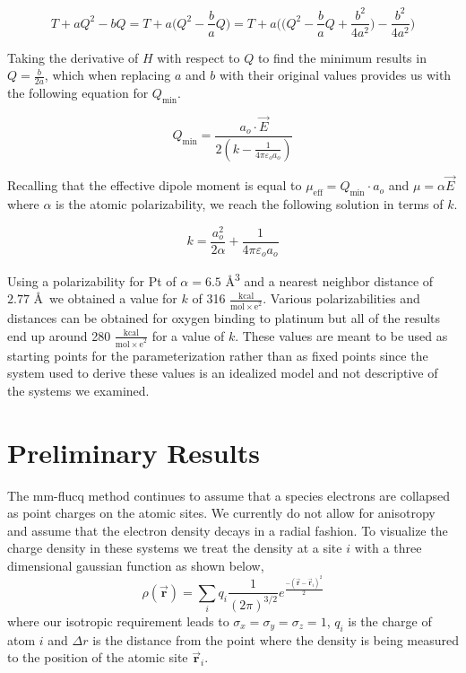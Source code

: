 \begin{equation*}
T + aQ^2 - bQ  = T + a\bigg(Q^2 - \frac{b}{a}Q\bigg) = T + a\bigg(\bigg(Q^2 - \frac{b}{a}Q + \frac{b^2}{4a^2}\bigg) - \frac{b^2}{4a^2}\bigg)
\end{equation*}

Taking the derivative of $H$ with respect to $Q$ to find the minimum results in $Q = \frac{b}{2a}$,
which when replacing $a$ and $b$ with their original values provides us with
the following equation for $Q_{\text{min}}$.

\begin{equation*}
Q_{\text{min}} = \frac{a_o \cdot \vec{E}}{2(k - \frac{1}{4\pi\varepsilon_o a_o})}
\end{equation*}

Recalling that the effective dipole moment is equal to $\mu_{\text{eff}} =
Q_{\text{min}}\cdot a_o$ and $\mu = \alpha\vec{E}$ where $\alpha$ is the atomic
polarizability, we reach the following solution in terms of $k$.

\begin{equation*}
k = \frac{a_o^2}{2\alpha} + \frac{1}{4\pi\varepsilon_o a_o}
\end{equation*}

Using a polarizability for Pt of $\alpha = 6.5$ \AA\textsuperscript{3} and a
nearest neighbor distance of $2.77$ \AA~we obtained a value for $k$ of 316
$\frac{\text{kcal}}{\mathrm{mol\times e}^2}$. Various polarizabilities and
distances can be obtained for oxygen binding to platinum but all of the results
end up around 280 $\frac{\text{kcal}}{\mathrm{mol\times e}^2}$ for a value of
$k$. These values are meant to be used as starting points for the
parameterization rather than as fixed points since the system used to derive
these values is an idealized model and not descriptive of the systems we
examined.

\section{Preliminary Results}

The mm-flucq method continues to assume that a species electrons are collapsed
as point charges on the atomic sites. We currently do not allow for anisotropy and assume
that the electron density decays in a radial fashion. To visualize the charge density in these systems we treat the
density at a site $i$ with a three dimensional gaussian function as shown
below,
\begin{equation*}
\rho(\vec{\mathbf{r}}) = \sum_i q_{i} \frac{1}{(2\pi)^{3/2}}e^{\frac{-(\vec{\mathbf{r}}-\vec{\mathbf{r}}_i)^2}{2}}
\end{equation*}
where our isotropic requirement leads to $\sigma_x = \sigma_y = \sigma_z = 1$,
$q_i$ is the charge of atom $i$ and $\Delta r$ is the distance from the point
where the density is being measured to the position of the atomic site
$\vec{\mathbf{r}}_i$.

